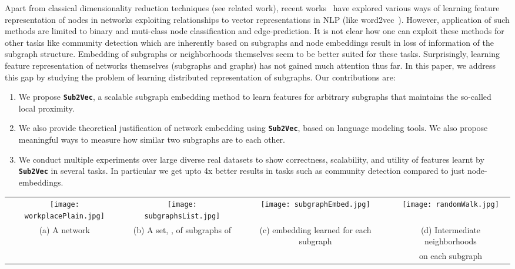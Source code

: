 \documentclass[sigconf]{acmart}
\newcommand{\alg}{{\bf {\tt Sub2Vec}}\xspace}
\begin{document}
Apart from classical dimensionality reduction techniques (see related work), recent works~\cite{perozzi2014deepwalk, grover2016node2vec, wang2016structural, tang2015line} have explored various ways of learning feature representation of nodes in networks exploiting relationships to vector representations in NLP (like word2vec~\cite{mikolov2013distributed}). However, application of such methods are limited to binary and muti-class node classification and edge-prediction. It is not clear how one can exploit these methods for other tasks like community detection which are inherently based on subgraphs and node embeddings result in loss of information of the subgraph structure. Embedding of subgraphs or neighborhoods themselves seem to be better suited for these tasks. Surprisingly, learning feature representation of networks themselves (subgraphs and graphs) has not gained much attention thus far. In this paper, we address this gap by  studying the problem of learning distributed representation of subgraphs.  
Our contributions are:
\begin{enumerate}
\item We propose \alg, a scalable subgraph embedding method to learn features for arbitrary subgraphs that maintains the so-called local proximity.

\item We also provide theoretical justification of network embedding using \alg, based on language modeling tools. We also propose meaningful ways to measure how similar two subgraphs are to each other.

\item We conduct multiple experiments over large diverse real datasets to show correctness, scalability, and utility of features learnt by \alg in several tasks. In particular we get upto 4x better results in tasks such as community detection compared to just node-embeddings. 

\end{enumerate}

\begin{figure*}[htb]
\begin{center}

\begin{tabular}{ccc|c}
		\texttt{[image: workplacePlain.jpg]} &
       \texttt{[image: subgraphsList.jpg]} &
       \texttt{[image: subgraphEmbed.jpg]} &
       \texttt{[image: randomWalk.jpg]} \\
      (a) A network    & (b) A set, , of subgraphs of   & (c) embedding learned for each subgraph  & (d)  Intermediate neighborhoods\\
      & & &  on each subgraph
    \end{tabular}
\end{center}
\caption{\textbf{An overview of our \alg. Our input  is a set of subgraphs  drawn from a network . We obtain  dimensional embedding of subgraphs such that we maximize the likelihood of observing intermediate neighborhoods. }}
\label{fig:intro}
\end{figure*}
 
\end{document}

